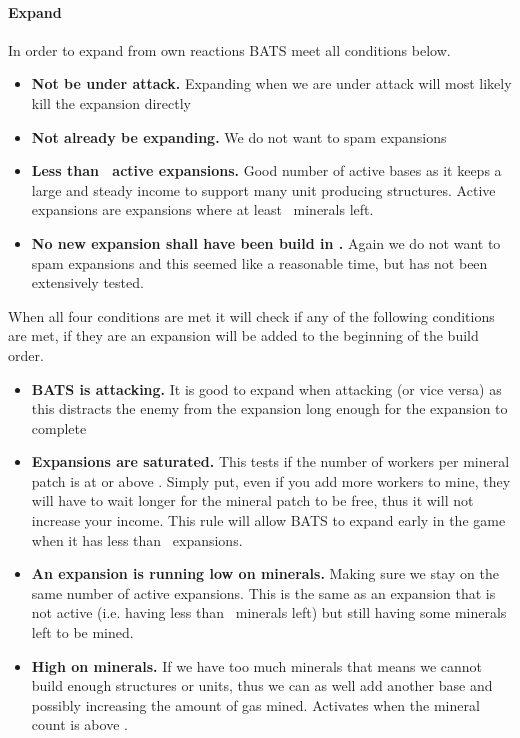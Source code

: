 \paragraph{Expand}
In order to expand from own reactions BATS meet all conditions below.
\begin{itemize}
  \item \textbf{Not be under attack.} Expanding when we are under attack will most likely kill the expansion
	  directly
	\item \textbf{Not already be expanding.} We do not want to spam expansions
	\item \textbf{Less than \commanderExpansionActiveMax~active expansions.} Good number of
	  active bases as it keeps a large and steady income to support many unit producing structures.
	  Active expansions are expansions where at least
	  \classificationExpansionExpansionMineralsLow~minerals left.
	\item \textbf{No new expansion shall have been build in \commanderExpansionIntervalMin.} Again we do not
	  want to spam expansions and this seemed like a reasonable time, but has not been extensively
	  tested.
\end{itemize}
When all four conditions are met it will check if any of the following conditions are met, if they
are an expansion will be added to the beginning of the build order.
\begin{itemize}
	\item \textbf{BATS is attacking.} It is good to expand when attacking (or vice versa) as this
	  distracts the enemy from the expansion long enough for the expansion to complete\cite{day9}
	\item \textbf{Expansions are saturated.} This tests if the number of workers per mineral patch is at or
	  above \classificationExpansionWorkersPerMineralSaturation. Simply put, even if you add more
	  workers to mine, they will have to wait longer for the mineral patch to be free, thus it will
	  not increase your income. This rule will allow BATS to expand early in the game when it has
	  less than \commanderExpansionActiveMax~expansions.
	\item \textbf{An expansion is running low on minerals.} Making sure we stay on the same number of active
	  expansions. This is the same as an expansion that is not active (i.e. having less than
	  \classificationExpansionExpansionMineralsLow~minerals left) but still having some minerals
	  left to be mined.
	\item \textbf{High on minerals.} If we have too much minerals that means we cannot build enough structures
	  or units, thus we can as well add another base and possibly increasing the amount of gas
	  mined. Activates when the mineral count is above \classificationHighOnMinerals.
\end{itemize}

